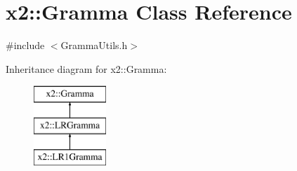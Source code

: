\hypertarget{classx2_1_1_gramma}{}\section{x2\+:\+:Gramma Class Reference}
\label{classx2_1_1_gramma}


{\ttfamily \#include $<$Gramma\+Utils.\+h$>$}

Inheritance diagram for x2\+:\+:Gramma\+:\begin{figure}[H]
\begin{center}
\leavevmode
\includegraphics[height=3.000000cm]{classx2_1_1_gramma}
\end{center}
\end{figure}
